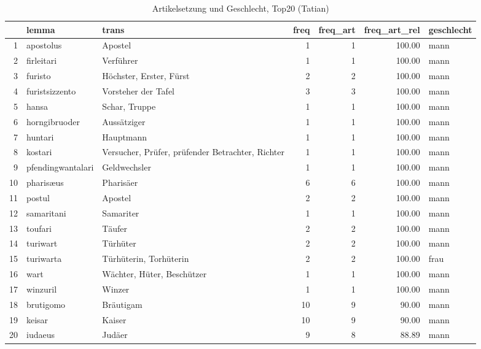 \begin{table}[ht]
\centering
\begin{tabular}{rllrrrl}
  \hline
 & lemma & trans & freq & freq\_art & freq\_art\_rel & geschlecht \\ 
  \hline
1 & apostolus & Apostel &   1 &   1 & 100.00 & mann \\ 
  2 & firleitari & Verführer &   1 &   1 & 100.00 & mann \\ 
  3 & furisto & Höchster, Erster, Fürst &   2 &   2 & 100.00 & mann \\ 
  4 & furistsizzento & Vorsteher der Tafel &   3 &   3 & 100.00 & mann \\ 
  5 & hansa & Schar, Truppe &   1 &   1 & 100.00 & mann \\ 
  6 & horngibruoder & Aussätziger &   1 &   1 & 100.00 & mann \\ 
  7 & huntari & Hauptmann &   1 &   1 & 100.00 & mann \\ 
  8 & kostari & Versucher, Prüfer, prüfender Betrachter, Richter &   1 &   1 & 100.00 & mann \\ 
  9 & pfendingwantalari & Geldwechsler &   1 &   1 & 100.00 & mann \\ 
  10 & pharisæus & Pharisäer &   6 &   6 & 100.00 & mann \\ 
  11 & postul & Apostel &   2 &   2 & 100.00 & mann \\ 
  12 & samaritani & Samariter &   1 &   1 & 100.00 & mann \\ 
  13 & toufari & Täufer &   2 &   2 & 100.00 & mann \\ 
  14 & turiwart & Türhüter &   2 &   2 & 100.00 & mann \\ 
  15 & turiwarta & Türhüterin, Torhüterin &   2 &   2 & 100.00 & frau \\ 
  16 & wart & Wächter, Hüter, Beschützer &   1 &   1 & 100.00 & mann \\ 
  17 & winzuril & Winzer &   1 &   1 & 100.00 & mann \\ 
  18 & brutigomo & Bräutigam &  10 &   9 & 90.00 & mann \\ 
  19 & keisar & Kaiser &  10 &   9 & 90.00 & mann \\ 
  20 & iudaeus & Judäer &   9 &   8 & 88.89 & mann \\ 
   \hline
\end{tabular}
\caption{Artikelsetzung und Geschlecht, Top20  (Tatian)} 
\end{table}
